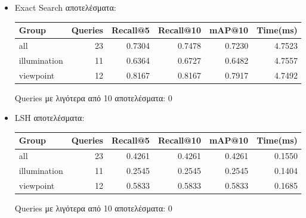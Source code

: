 \documentclass [conference]{IEEEtran}
\begin{document}
\begin{itemize}

    \item Exact Search αποτελέσματα:
    \begin{table}[H]
    \centering
    \small
    \setlength{\tabcolsep}{3pt}
    \begin{tabular}{l r r r r r}
    \hline
    \textbf{Group} & \textbf{Queries} & \textbf{Recall@5} & \textbf{Recall@10} & \textbf{mAP@10} & \textbf{Time(ms)} \\
    \hline
    all & 23 & 0.7304 & 0.7478 & 0.7230 & 4.7523 \\
    illumination & 11 & 0.6364 & 0.6727 & 0.6482 & 4.7557 \\
    viewpoint & 12 & 0.8167 & 0.8167 & 0.7917 & 4.7492 \\
    \hline
    \end{tabular}
    \par\smallskip
    \footnotesize Queries με λιγότερα από 10 αποτελέσματα: 0
    \end{table}
    

    \item LSH αποτελέσματα:
    \begin{table}[H]
    \centering
    \small
    \setlength{\tabcolsep}{3pt}
    \begin{tabular}{l r r r r r}
    \hline
    \textbf{Group} & \textbf{Queries} & \textbf{Recall@5} & \textbf{Recall@10} & \textbf{mAP@10} & \textbf{Time(ms)} \\
    \hline
    all & 23 & 0.4261 & 0.4261 & 0.4261 & 0.1550 \\
    illumination & 11 & 0.2545 & 0.2545 & 0.2545 & 0.1404 \\
    viewpoint & 12 & 0.5833 & 0.5833 & 0.5833 & 0.1685 \\
    \hline
    \end{tabular}
    \par\smallskip
    \footnotesize Queries με λιγότερα από 10 αποτελέσματα: 0
    \end{table}



\end{itemize}
\end{document}
